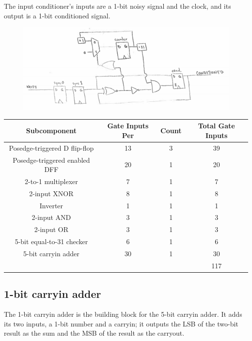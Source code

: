 \documentclass{article}
\begin{document}
The input conditioner's inputs are a 1-bit noisy signal and the clock, and its output is a 1-bit conditioned signal.\\

\begin{figure}[!ht]
\centering
\includegraphics[width=\textwidth]{img/ic}
\label{fig:ic}
\end{figure}

\begin{center}
\begin{tabular}{ ccc|c }
 \textbf{Subcomponent} & \textbf{Gate Inputs Per} & \textbf{Count} & \textbf{Total Gate Inputs} \\
 \hline
 Posedge-triggered D flip-flop & 13 & 3 & 39 \\
 Posedge-triggered enabled DFF & 20 & 1 & 20 \\
 2-to-1 multiplexer & 7 & 1 & 7 \\
 2-input XNOR & 8 & 1 & 8 \\
 Inverter & 1 & 1 & 1 \\
 2-input AND & 3 & 1 & 3 \\
 2-input OR & 3 & 1 & 3 \\
 5-bit equal-to-31 checker & 6 & 1 & 6 \\
 5-bit carryin adder & 30 & 1 & 30 \\
 \hline
 &&& 117\\
\end{tabular}
\end{center}

\newpage

\subsection{1-bit carryin adder}
The 1-bit carryin adder is the building block for the 5-bit carryin adder. It adds its two inputs, a 1-bit number and a carryin; it outputs the LSB of the two-bit result as the sum and the MSB of the result as the carryout. \\
\end{document}
